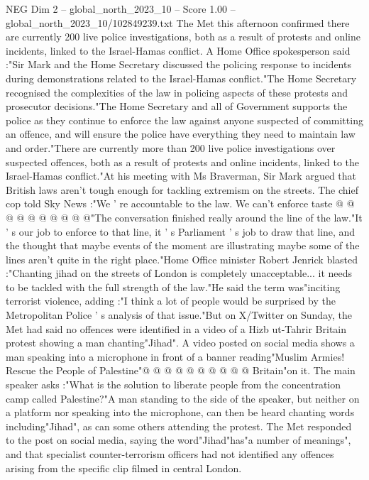 \begin{textsample}{NEG Dim 2 – global\_north\_2023\_10 – Score 1.00 – global\_north\_2023\_10/102849239.txt}  \label{ex:f2_neg_298}
The Met this afternoon confirmed there are currently 200 live police investigations, both as a result of protests and online incidents, linked to the Israel-Hamas conflict.
A Home Office spokesperson said :"Sir Mark and the Home Secretary discussed the policing response to incidents during demonstrations related to the Israel-Hamas conflict."The Home Secretary recognised the complexities of the law in policing aspects of these protests and prosecutor decisions."The Home Secretary and all of Government supports the police as they continue to enforce the law against anyone suspected of committing an offence, and will ensure the police have everything they need to maintain law and order."There are currently more than 200 live police investigations over suspected offences, both as a result of protests and online incidents, linked to the Israel-Hamas conflict."At his meeting with Ms Braverman, Sir Mark argued that British laws aren't tough enough for tackling extremism on the streets.
The chief cop told Sky News :"We ' re accountable to the law.
We can't enforce taste @ @ @ @ @ @ @ @ @ @"The conversation finished really around the line of the law."It ' s our job to enforce to that line, it ' s Parliament ' s job to draw that line, and the thought that maybe events of the moment are illustrating maybe some of the lines aren't quite in the right place."Home Office minister Robert Jenrick blasted :"Chanting jihad on the streets of London is completely unacceptable... it needs to be tackled with the full strength of the law."He said the term was"inciting terrorist violence, adding :"I think a lot of people would be surprised by the Metropolitan Police ' s analysis of that issue."But on X/Twitter on Sunday, the Met had said no offences were identified in a video of a Hizb ut-Tahrir Britain protest showing a man chanting"Jihad".
A video posted on social media shows a man speaking into a microphone in front of a banner reading"Muslim Armies!
Rescue the People of Palestine"@ @ @ @ @ @ @ @ @ @ Britain"on it.
The main speaker asks :"What is the solution to liberate people from the concentration camp called Palestine?"A man standing to the side of the speaker, but neither on a platform nor speaking into the microphone, can then be heard chanting words including"Jihad", as can some others attending the protest.
The Met responded to the post on social media, saying the word"Jihad"has"a number of meanings", and that specialist counter-terrorism officers had not identified any offences arising from the specific clip filmed in central London.

\end{textsample}
